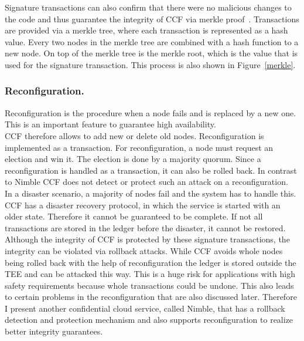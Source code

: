   Signature transactions can also confirm that there were no malicious changes to the code and thus guarantee the integrity of CCF via merkle proof~\cite{merkle}. Transactions are provided via a merkle tree, where each transaction is represented as a hash value. Every two nodes in the merkle tree are combined with a hash function to a new node. On top of the merkle tree is the merkle root, which is the value that is used for the signature transaction. This process is also shown in Figure~\ref{merkle}.\\
  
   
  \subsubsection*{Reconfiguration.}
  Reconfiguration is the procedure when a node fails and is replaced by a new one. This is an important feature to guarantee high availability.\\
CCF therefore allows to add new or delete old nodes. Reconfiguration is implemented as a transaction. For reconfiguration, a node must request an election and win it. The election is done by a majority quorum. Since a reconfiguration is handled as a transaction, it can also be rolled back. In contrast to Nimble CCF does not detect or protect such an attack on a reconfiguration.\\%
In a disaster scenario, a majority of nodes fail and the system has to handle this. CCF has a disaster recovery protocol, in which the service is started with an older state. Therefore it cannot be guaranteed to be complete. If not all transactions are stored in the ledger before the disaster, it cannot be restored. \\
  Although the integrity of CCF is protected by these signature transactions, the integrity can be violated via rollback attacks. While CCF avoids whole nodes being rolled back with the help of reconfiguration the ledger is stored outside the TEE and can be attacked this way. This is a huge risk for applications with high safety requirements because whole transactions could be undone. This also leads to certain problems in the reconfiguration that are also discussed later. Therefore I present another confidential cloud service, called Nimble, that has a rollback detection and protection mechanism and also supports reconfiguration to realize better integrity guarantees.
 

